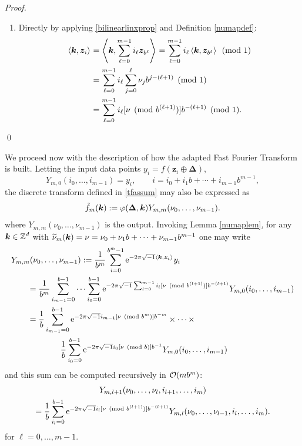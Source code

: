 \documentclass[graybox]{svmult}
\newcommand{\Z}{\mathbb{Z}} %
\newcommand{\bsz}{\boldsymbol{z}}    %
\newcommand{\bsDelta}{\boldsymbol{\Delta}}    %
\begin{document}
\begin{proof}
\begin{enumerate}
\item Directly by applying \eqref{bilinearlinxprop} and Definition \ref{numapdef}:
\begin{align*}
\ip{\bsk}{\bsz_i} &= \ip{\bsk}{\sum_{\ell=0}^{m-1} i_\ell \bsz_{b^{\ell}}} = \sum_{\ell=0}^{m-1} i_\ell \ip{\bsk}{\bsz_{b^{\ell}}} \pmod 1 \\
& = \sum_{\ell=0}^{m-1} i_\ell \sum_{j=0}^{\ell} \nu_jb^{j-(\ell+1)} \pmod 1\\
&=\sum_{\ell=0}^{m-1} i_\ell [\nu \pmod  {b^{(\ell+1)}}]  b^{-(\ell+1)} \pmod 1.
\end{align*}
\end{enumerate}
\hfill\qed
\end{proof}
We proceed now with the description of how the adapted Fast Fourier Transform is built. Letting the input data points $y_i=f(\bsz_i\oplus \bsDelta)$,
\[
Y_{m,0}(i_0,\ldots, i_{m-1}) = y_i, \qquad i=i_0 + i_1 b + \cdots + i_{m-1} b^{m-1},
\]
the discrete transform defined in \eqref{tfassum} may also be expressed as
\begin{align}
\nonumber
\tf_m(\bsk):=\varphi(\bsDelta,\bsk)  Y_{m,m}(\nu_0, \ldots, \nu_{m-1}).
\end{align}
where $ Y_{m,m}(\nu_0, \ldots, \nu_{m-1})$ is the output. Invoking Lemma \ref{numaplem}, for any $\bsk \in \Z^d$ with $\widetilde{\nu}_m(\boldsymbol{k})=\nu = \nu_0 + \nu_1 b  + \cdots + \nu_{m-1} b^{m-1}$ one may write
\begin{align}
\nonumber
\MoveEqLeft{Y_{m,m}(\nu_0, \ldots, \nu_{m-1})} : = \frac{1}{b^m} \sum_{i=0}^{b^m-1} \E^{-2 \pi \sqrt{-1} \ip{\bsk}{\bsz_i}} y_i \\
\nonumber
& = \frac{1}{b^m} \sum_{i_{m-1}=0}^{b-1} \cdots \sum_{i_0=0}^{b-1} \E^{-2 \pi \sqrt{-1}\sum_{l=0}^{m-1} i_l [\nu \pmod  {b^{(l+1)}}]  b^{-(l+1)}} Y_{m,0}(i_0,\ldots, i_{m-1}) \\
\nonumber
& = \frac{1}{b} \sum_{i_{m-1}=0}^{b-1}\E^{-2 \pi \sqrt{-1}  i_{m-1}[\nu \pmod  {b^{m}}]  b^{-m}}  \times\cdots\times \\
&\qquad \qquad \frac{1}{b} \sum_{i_0=0}^{b-1} \E^{-2 \pi \sqrt{-1} i_0 [\nu \pmod  {b}]  b^{-1}} Y_{m,0}(i_0,\ldots, i_{m-1})
\nonumber
\end{align}
and this sum can be computed recursively in $\mathcal{O}(mb^m)$:
\begin{multline*}
Y_{m,l+1}(\nu_0, \ldots, \nu_{l},i_{l+1}, \ldots, i_m) \\
= \frac{1}{b} \sum_{i_l=0}^{b-1} \mathrm{e}^{-2 \pi \sqrt{-1}  i_{l}[\nu \pmod  {b^{(l+1)}}]  b^{-(l+1)}} Y_{m,l}(\nu_0, \ldots, \nu_{l-1},i_{l}, \ldots, i_m).
\end{multline*}
for $\ell=0,\dots,m-1$.
\end{document}
